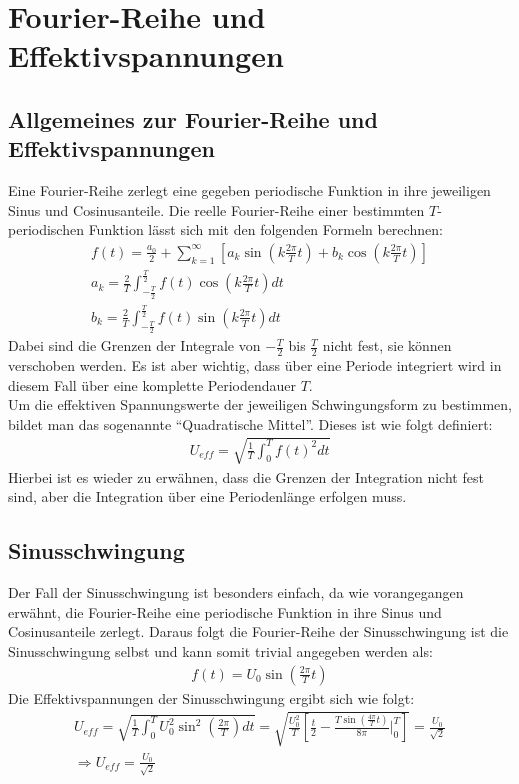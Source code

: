 \newpage
\section{Fourier-Reihe und Effektivspannungen}
\label{sec:fourierseries}
\subsection*{Allgemeines zur Fourier-Reihe und Effektivspannungen}
\label{sub:fourierseriesAllgemein}
Eine Fourier-Reihe zerlegt eine gegeben periodische Funktion in ihre jeweiligen Sinus und Cosinusanteile. Die reelle Fourier-Reihe einer bestimmten $T$-periodischen Funktion lässt sich mit den folgenden Formeln berechnen:
\begin{gather}
    f(t) = \frac{a_0}{2} + \sum^{\infty}_{k=1} \left[a_k \sin(k\frac{2\pi}{T} t) +b_k \cos(k\frac{2\pi}{T} t)\right]\\
    a_k = \frac{2}{T} \int^{\frac{T}{2}}_{-\frac{T}{2}} f(t)\cos(k \frac{2\pi}{T} t)dt\\
    b_k = \frac{2}{T} \int^{\frac{T}{2}}_{-\frac{T}{2}} f(t)\sin(k \frac{2\pi}{T} t)dt
\end{gather}
Dabei sind die Grenzen der Integrale von $-\frac{T}{2}$ bis $\frac{T}{2}$ nicht fest, sie können verschoben werden. Es ist aber wichtig, dass über eine Periode integriert wird in diesem Fall über eine komplette Periodendauer $T$.\\

Um die effektiven Spannungswerte der jeweiligen Schwingungsform zu bestimmen, bildet man das sogenannte \enquote{Quadratische Mittel}. Dieses ist wie folgt definiert:
\begin{gather}
    U_{eff} = \sqrt{\frac{1}{T}\int^T_0 f(t)^2 dt}
\end{gather}
Hierbei ist es wieder zu erwähnen, dass die Grenzen der Integration nicht fest sind, aber die Integration über eine Periodenlänge erfolgen muss.

\subsection*{Sinusschwingung}
\label{sub:sinus}
Der Fall der Sinusschwingung ist besonders einfach, da wie vorangegangen erwähnt, die Fourier-Reihe eine periodische Funktion in ihre Sinus und Cosinusanteile zerlegt. Daraus folgt die Fourier-Reihe der Sinusschwingung ist die Sinusschwingung selbst und kann somit trivial angegeben werden als:
\begin{gather}
    \boxed{f(t) = U_0\sin(\frac{2\pi}{T} t)}
\end{gather}
Die Effektivspannungen der Sinusschwingung ergibt sich wie folgt:
\begin{gather}
    U_{eff} = \sqrt{\frac{1}{T}\int^T_0 U_0^2 \sin^2\left(\frac{2\pi}{T}\right) dt} = \sqrt{\frac{U_0^2}{T} \left[\frac{t}{2} - \frac{T\sin(\frac{4\pi}{T}t)}{8\pi}\bigg \vert^T_0 \right]} = \frac{U_0}{\sqrt{2}}\\[0,5cm]
    \Rightarrow\boxed{U_{eff}=\frac{U_0}{\sqrt{2}}}
\end{gather}
\newpage

